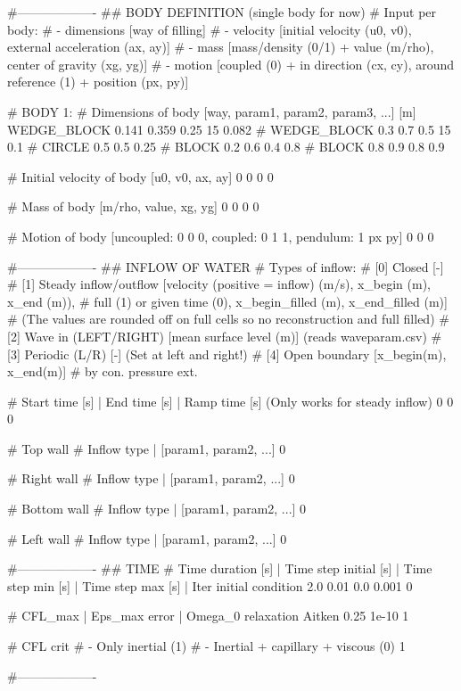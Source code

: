 #-------------------
## BODY DEFINITION (single body for now)
# Input per body:
# - dimensions      [way of filling]
# - velocity        [initial velocity (u0, v0), external acceleration (ax, ay)]
# - mass            [mass/density (0/1) + value (m/rho), center of gravity (xg, yg)]
# - motion          [coupled (0) + in direction (cx, cy), around reference (1) + position (px, py)]

# BODY 1:
# Dimensions of body [way, param1, param2, param3, ...] [m]
WEDGE_BLOCK 0.141 0.359 0.25 15 0.082
# WEDGE_BLOCK 0.3 0.7 0.5 15 0.1
# CIRCLE 0.5 0.5 0.25
# BLOCK 0.2 0.6 0.4 0.8
# BLOCK 0.8 0.9 0.8 0.9

# Initial velocity of body [u0, v0, ax, ay]
0 0 0 0

# Mass of body [m/rho, value, xg, yg]
0 0 0 0

# Motion of body [uncoupled: 0 0 0, coupled: 0 1 1, pendulum: 1 px py]
0 0 0

#-------------------
## INFLOW OF WATER
# Types of inflow:
# [0] Closed                [-]
# [1] Steady inflow/outflow [velocity (positive = inflow) (m/s), x_begin (m), x_end (m)),
#                            full (1) or given time (0), x_begin_filled (m), x_end_filled (m)]
#                           (The values are rounded off on full cells so no reconstruction and full filled)
# [2] Wave in (LEFT/RIGHT)  [mean surface level (m)] (reads waveparam.csv)
# [3] Periodic (L/R)        [-] (Set at left and right!)
# [4] Open boundary         [x_begin(m), x_end(m)]
#     by con. pressure ext.

# Start time [s] | End time [s] | Ramp time [s] (Only works for steady inflow)
0 0 0

# Top wall
# Inflow type | [param1, param2, ...]
0

# Right wall
# Inflow type | [param1, param2, ...]
0

# Bottom wall
# Inflow type | [param1, param2, ...]
0

# Left wall
# Inflow type | [param1, param2, ...]
0

#-------------------
## TIME
# Time duration [s]	| Time step initial [s]		| Time step min [s]	| Time step max [s] | Iter initial condition
2.0 0.01 0.0 0.001 0

# CFL_max | Eps_max error | Omega_0 relaxation Aitken
0.25		1e-10	        1

# CFL crit
# - Only inertial (1)
# - Inertial + capillary + viscous (0)
1

#-------------------

